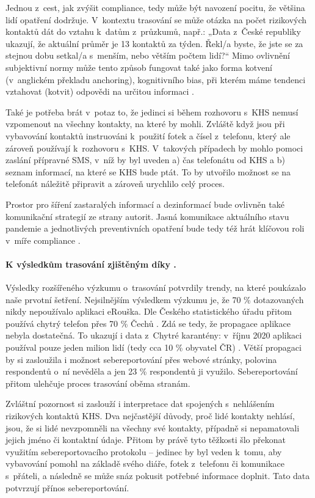 \newpage

Jednou z~cest, jak zvýšit compliance, tedy může být navození pocitu, že většina lidí opatření dodržuje. V~kontextu trasování se může otázka na počet rizikových kontaktů dát do vztahu k~datům z~průzkumů, např.: „Data z~České republiky ukazují, že aktuální průměr je 13 kontaktů za týden. Řekl/a byste, že jste se za stejnou dobu setkal/a s~menším, nebo větším počtem lidí?“ Mimo ovlivnění subjektivní normy může tento způsob fungovat také jako forma kotvení (v~anglickém překladu anchoring), kognitivního bias, při kterém máme tendenci vztahovat (kotvit) odpovědi na určitou informaci \cite{Tversky1974}.

Také je potřeba brát v~potaz to, že jedinci si během rozhovoru s~KHS nemusí vzpomenout na všechny kontakty, na které by mohli. Zvláště když jsou při vybavování kontaktů instruováni k~použití fotek a čísel z~telefonu, který ale zároveň používají k~rozhovoru s~KHS. V~takových případech by mohlo pomoci zaslání pří\-prav\-né SMS, v~níž by byl uveden a) čas telefonátu od KHS a b) seznam informací, na které se KHS bude ptát. To by utvořilo možnost se na telefonát náležitě připravit a zároveň urychlilo celý proces.

Prostor pro šíření zastaralých informací a dezinformací bude ovlivněn také komunikační strategií ze strany autorit. Jasná komunikace aktuálního stavu pandemie a jednotlivých preventivních opatření bude tedy též hrát klíčovou roli v~míře compliance \cite{Hyland-Wood2021}. 

\paragraph*{K výsledkům trasování zjištěným díky .} Vý\-sled\-ky roz\-ší\-ře\-né\-ho výzkumu o~trasování potvrdily trendy, na které poukázalo naše prvotní šetření. Nejsilnějším výsledkem výzkumu je, že 70 \% dotazovaných nikdy nepoužívalo aplikaci eRouška. Dle Českého statistického úřadu přitom používá chytrý telefon přes 70 \% Čechů \cite{Mana2020}. Zdá se tedy, že propagace aplikace nebyla dostatečná. To ukazují i data z~Chytré karantény: v~říjnu 2020 aplikaci používal pouze jeden milion lidí (tedy cca 10 \% obyvatel ČR) \cite{Fiser2020}. Větší propagaci by si zasloužila i možnost sebereportování přes webové stránky, polovina respondentů o~ní nevěděla a jen 23 \% respondentů ji využilo. Sebereportování přitom ulehčuje proces trasování oběma stranám. 

Zvláštní pozornost si zaslouží i interpretace dat spojených s~nehlášením rizikových kontaktů KHS. Dva nejčastější důvody, proč lidé kontakty nehlásí, jsou, že si lidé nevzpomněli na všechny své kontakty, případně si nepamatovali jejich jméno či kontaktní údaje. Přitom by právě tyto těžkosti šlo překonat využitím sebereportovacího protokolu -- jedinec by byl veden k~tomu, aby vybavování pomohl na základě svého diáře, fotek z~telefonu či komunikace s~přáteli, a následně se může snáz pokusit potřebné informace doplnit. Tato data potvrzují přínos sebereportování.

